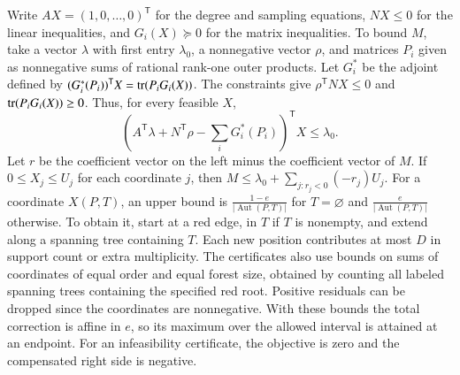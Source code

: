 Write $AX=(1,0,\ldots,0)^{\mathsf T}$ for the degree and sampling
equations, $NX\le0$ for the linear inequalities, and $G_i(X)\succeq0$
for the matrix inequalities. To bound $M$, take a vector
$\lambda$ with first entry $\lambda_0$, a nonnegative vector $\rho$, and matrices $P_i$
given as nonnegative sums of rational rank-one outer products.
Let $G_i^*$ be the adjoint defined by
$(G_i^*(P_i))^{\mathsf T}X=\operatorname{tr}(P_iG_i(X))$. The constraints give $\rho^{\mathsf T}NX\leq0$ and
$\operatorname{tr}(P_iG_i(X))\geq0$. Thus, for every feasible $X$,
\[
 \left(A^{\mathsf T}\lambda+N^{\mathsf T}\rho
        -\sum_iG_i^*(P_i)\right)^{\mathsf T}X
 \le\lambda_0 .
\]
Let $r$ be the coefficient vector on the left minus the coefficient
vector of $M$. If $0\le X_j\le U_j$ for each coordinate $j$, then
$M\le\lambda_0+\sum_{j:r_j<0}(-r_j)U_j$. For a coordinate $X(P,T)$,
an upper bound is
$\frac{1-e}{|\operatorname{Aut}(P,T)|}$ for $T=\varnothing$ and
$\frac{e}{|\operatorname{Aut}(P,T)|}$ otherwise. To obtain it, start at
a red edge, in $T$ if $T$ is nonempty, and extend along a
spanning tree containing $T$. Each new position contributes at
most $D$ in support count or extra multiplicity. The certificates
also use bounds on sums of coordinates of equal order and
equal forest size, obtained by counting all labeled spanning
trees containing the specified red root. Positive residuals
can be dropped since the coordinates are nonnegative. With these bounds the total correction is affine in $e$, so
its maximum over the allowed interval is attained at an endpoint. For an infeasibility certificate, the objective
is zero and the compensated right side is negative.
